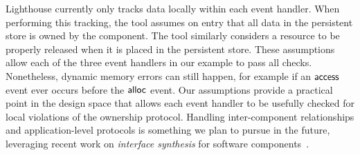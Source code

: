 Lighthouse currently only tracks data locally within each event handler.  
%
When performing this tracking, the tool assumes on entry that all data in
the persistent store is owned by the component.
%
The tool similarly considers a resource to be properly released when it is
placed in the persistent store.  
%
These assumptions allow each of the three event handlers in our example to
pass all checks.  
%
Nonetheless, dynamic memory errors can still happen, for example if an
${\mathsf{access}}$ event ever occurs before the ${\mathsf{alloc}}$ event.  
%
Our assumptions provide a practical point in the design space that allows
each event handler to be usefully checked for local violations of the
ownership protocol.  
%
Handling inter-component relationships and application-level protocols is
something we plan to pursue in the future, leveraging recent work on {\em
interface synthesis} for software components~\cite{AlurPOPL05,HJM05}.


